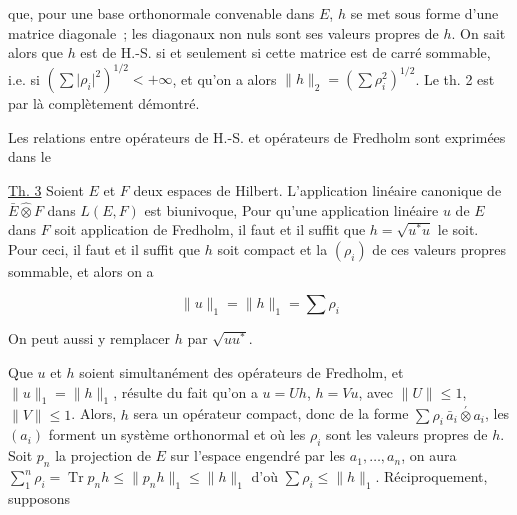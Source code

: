 que, pour une base orthonormale convenable dans $E$,
$h$ se met sous forme d'une matrice diagonale \,;
  les  diagonaux  non nuls sont
ses valeurs propres  de $h$. On sait alors que $h$ est
de H.-S. si et seulement si cette matrice est
de carré sommable, i.e. si $(\sum\lvert\rho_i\rvert^2)^{1/2}<+\infty$, et
qu'on a alors $\|h\|_2=(\sum\rho_i^2)^{1/2}$. Le th. 2 est par là
complètement démontré.

Les relations entre opérateurs de H.-S. et opérateurs
de Fredholm sont exprimées dans le

\uline{Th. 3} Soient $E$ et $F$ deux espaces de Hilbert. L'application
linéaire canonique de $\bar E\widehat\otimes F$ dans $L(E,F)$ est biunivoque,
 Pour qu'une application linéaire $u$ de $E$ dans $F$
soit application de Fredholm, il faut et il suffit
que $h=\sqrt{u^*u}$ le soit.  Pour ceci, il faut et il suffit que
 $h$ soit compact et la  $(\rho_i)$ de ces valeurs propres
 
sommable, et alors on a

\[
\|u\|_1=\|h\|_1=\sum\rho_i \tag*{(20)}
\]

On peut aussi y remplacer $h$ par $\sqrt{uu^*}$.


Que $u$ et $h$ soient simultanément des opérateurs
de Fredholm, et $\|u\|_1=\|h\|_1$, résulte du fait
qu'on a $u=Uh$, $h=Vu$, avec $\|U\|\leq1$, $\|V\|\leq1$.
  Alors, $h$ sera un opérateur compact, donc
 de la forme $\sum\rho_i\,\bar a_i\overset{' }{\otimes}a_i$, 
les $(a_i)$ forment un système orthonormal  et où les
$\rho_i$ sont les valeurs propres de $h$. Soit $p_n$ la
projection de $E$ sur l'espace engendré par les
$a_1,\ldots,a_n$, on aura $\sum_1^n\rho_i=\operatorname{Tr}p_nh\leq\|p_nh\|_1\leq\|h\|_1$
d'où $\sum\rho_i\leq\|h\|_1$. Réciproquement, supposons


